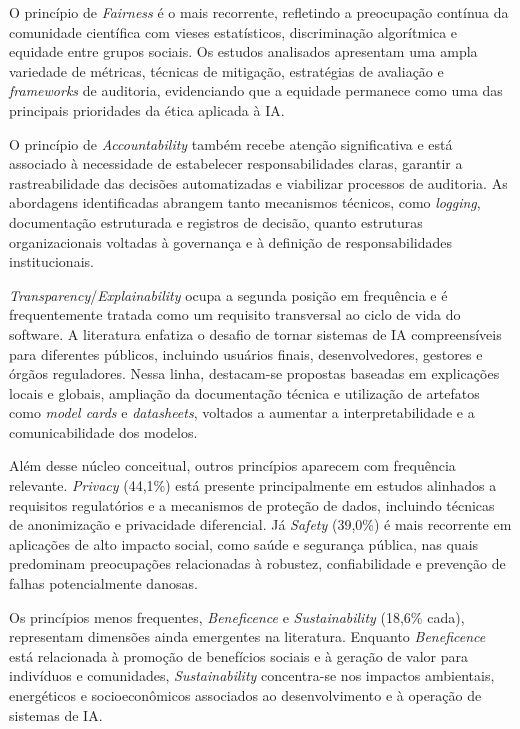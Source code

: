 O princípio de \textit{Fairness} é o mais recorrente, refletindo a preocupação contínua da comunidade científica com vieses estatísticos, discriminação algorítmica e equidade entre grupos sociais. Os estudos analisados apresentam uma ampla variedade de métricas, técnicas de mitigação, estratégias de avaliação e \textit{frameworks} de auditoria, evidenciando que a equidade permanece como uma das principais prioridades da ética aplicada à IA.

O princípio de \textit{Accountability} também recebe atenção significativa e está associado à necessidade de estabelecer responsabilidades claras, garantir a rastreabilidade das decisões automatizadas e viabilizar processos de auditoria. As abordagens identificadas abrangem tanto mecanismos técnicos, como \textit{logging}, documentação estruturada e registros de decisão, quanto estruturas organizacionais voltadas à governança e à definição de responsabilidades institucionais.

\textit{Transparency}/\textit{Explainability} ocupa a segunda posição em frequência e é frequentemente tratada como um requisito transversal ao ciclo de vida do software. A literatura enfatiza o desafio de tornar sistemas de IA compreensíveis para diferentes públicos, incluindo usuários finais, desenvolvedores, gestores e órgãos reguladores. Nessa linha, destacam-se propostas baseadas em explicações locais e globais, ampliação da documentação técnica e utilização de artefatos como \textit{model cards} e \textit{datasheets}, voltados a aumentar a interpretabilidade e a comunicabilidade dos modelos.

Além desse núcleo conceitual, outros princípios aparecem com frequência relevante. \textit{Privacy} (44,1\%) está presente principalmente em estudos alinhados a requisitos regulatórios e a mecanismos de proteção de dados, incluindo técnicas de anonimização e privacidade diferencial. Já \textit{Safety} (39,0\%) é mais recorrente em aplicações de alto impacto social, como saúde e segurança pública, nas quais predominam preocupações relacionadas à robustez, confiabilidade e prevenção de falhas potencialmente danosas.

Os princípios menos frequentes, \textit{Beneficence} e \textit{Sustainability} (18,6\% cada), representam dimensões ainda emergentes na literatura. Enquanto \textit{Beneficence} está relacionada à promoção de benefícios sociais e à geração de valor para indivíduos e comunidades, \textit{Sustainability} concentra-se nos impactos ambientais, energéticos e socioeconômicos associados ao desenvolvimento e à operação de sistemas de IA.


